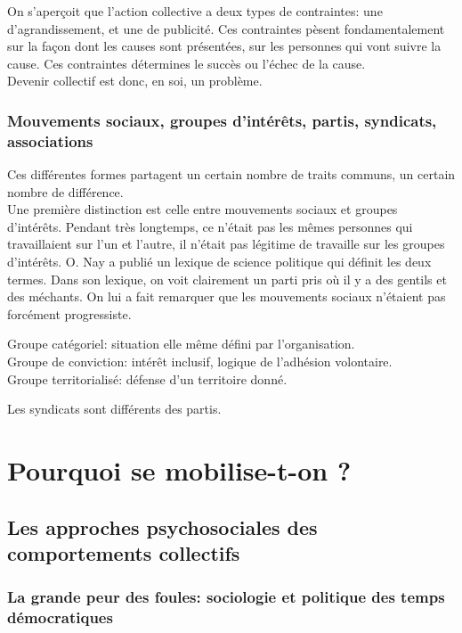 \documentclass[10pt, a4paper, openany]{book}
\begin{document}
On s'aperçoit que l'action collective a deux types de contraintes: une d'agrandissement, et une de publicité. Ces contraintes pèsent fondamentalement sur la façon dont les causes sont présentées, sur les personnes qui vont suivre la cause. Ces contraintes détermines le succès ou l'échec de la cause. \\
Devenir collectif est donc, en soi, un problème. 

\section{Mouvements sociaux, groupes d'intérêts, partis, syndicats, associations}

Ces différentes formes partagent un certain nombre de traits communs, un certain nombre de différence. \\
Une première distinction est celle entre mouvements sociaux et groupes d'intérêts. Pendant très longtemps, ce n'était pas les mêmes personnes qui travaillaient sur l'un et l'autre, il n'était pas légitime de travaille sur les groupes d'intérêts. O. Nay a publié un lexique de science politique qui définit les deux termes. Dans son lexique, on voit clairement un parti pris où il y a des gentils et des méchants. On lui a fait remarquer que les mouvements sociaux n'étaient pas forcément progressiste. 


Groupe catégoriel: situation elle même défini par l'organisation.\\
Groupe de conviction: intérêt inclusif, logique de l'adhésion volontaire. \\
Groupe territorialisé: défense d'un territoire donné. 


Les syndicats sont différents des partis.


\part{Pourquoi se mobilise-t-on ?}

\chapter{Les approches psychosociales des comportements collectifs}

\section{La grande peur des foules: sociologie et politique des temps démocratiques}
\end{document}

